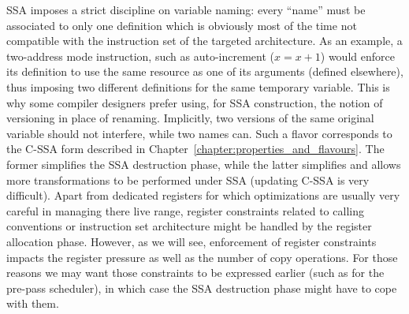 SSA imposes a strict discipline on variable naming: 
every ``name'' must be associated to only one definition which is obviously most of the time not compatible with the instruction set of the targeted architecture. 
As an example, a two-address mode instruction, such as auto-increment ($x=x+1$) would enforce its definition to use the same resource as one of its arguments (defined elsewhere), thus imposing two different definitions for the same temporary variable. 
This is why some compiler designers prefer using, for SSA construction, the notion of versioning in place of renaming. 
Implicitly, two versions of the same original variable should not interfere, while two names can.
Such a flavor corresponds to the C-SSA form  described in Chapter~\ref{chapter:properties_and_flavours}.
The former simplifies the SSA destruction phase, while the latter simplifies and allows more transformations to be performed under SSA (updating C-SSA is very difficult). 
Apart from dedicated registers for which optimizations are usually very careful in managing there live range, register constraints related to calling conventions or instruction set architecture might be handled by the register allocation phase. 
However, as we will see, enforcement of register constraints impacts the register pressure as well as the number of copy operations. 
For those reasons we may want those constraints to be expressed earlier (such as for the pre-pass scheduler), in which case the SSA destruction phase might have to cope with them.

